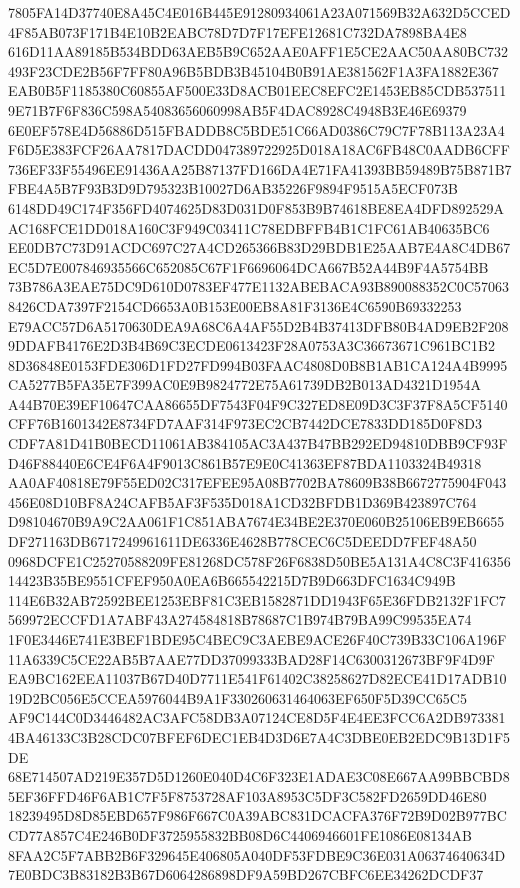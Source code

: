 \documentclass[UTF8,fontset=fandol,zihao=-4,a4paper]{ctexart}
\begin{document}
{{7805FA14D37740E8A45C4E016B445E91280934061A23A071569B32A632D5CCED4F85AB073F171B4E10B2EABC78D7D7F17EFE12681C732DA7898BA4E8
616D11AA89185B534BDD63AEB5B9C652AAE0AFF1E5CE2AAC50AA80BC732493F23CDE2B56F7FF80A96B5BDB3B45104B0B91AE381562F1A3FA1882E367
EAB0B5F1185380C60855AF500E33D8ACB01EEC8EFC2E1453EB85CDB5375119E71B7F6F836C598A54083656060998AB5F4DAC8928C4948B3E46E69379
6E0EF578E4D56886D515FBADDB8C5BDE51C66AD0386C79C7F78B113A23A4F6D5E383FCF26AA7817DACDD047389722925D018A18AC6FB48C0AADB6CFF
736EF33F55496EE91436AA25B87137FD166DA4E71FA41393BB59489B75B871B7FBE4A5B7F93B3D9D795323B10027D6AB35226F9894F9515A5ECF073B
6148DD49C174F356FD4074625D83D031D0F853B9B74618BE8EA4DFD892529AAC168FCE1DD018A160C3F949C03411C78EDBFFB4B1C1FC61AB40635BC6
EE0DB7C73D91ACDC697C27A4CD265366B83D29BDB1E25AAB7E4A8C4DB67EC5D7E007846935566C652085C67F1F6696064DCA667B52A44B9F4A5754BB
73B786A3EAE75DC9D610D0783EF477E1132ABEBACA93B890088352C0C570638426CDA7397F2154CD6653A0B153E00EB8A81F3136E4C6590B69332253
E79ACC57D6A5170630DEA9A68C6A4AF55D2B4B37413DFB80B4AD9EB2F2089DDAFB4176E2D3B4B69C3ECDE0613423F28A0753A3C36673671C961BC1B2
8D36848E0153FDE306D1FD27FD994B03FAAC4808D0B8B1AB1CA124A4B9995CA5277B5FA35E7F399AC0E9B9824772E75A61739DB2B013AD4321D1954A
A44B70E39EF10647CAA86655DF7543F04F9C327ED8E09D3C3F37F8A5CF5140CFF76B1601342E8734FD7AAF314F973EC2CB7442DCE7833DD185D0F8D3
CDF7A81D41B0BECD11061AB384105AC3A437B47BB292ED94810DBB9CF93FD46F88440E6CE4F6A4F9013C861B57E9E0C41363EF87BDA1103324B49318
AA0AF40818E79F55ED02C317EFEE95A08B7702BA78609B38B6672775904F043456E08D10BF8A24CAFB5AF3F535D018A1CD32BFDB1D369B423897C764
D98104670B9A9C2AA061F1C851ABA7674E34BE2E370E060B25106EB9EB6655DF271163DB6717249961611DE6336E4628B778CEC6C5DEEDD7FEF48A50
0968DCFE1C25270588209FE81268DC578F26F6838D50BE5A131A4C8C3F41635614423B35BE9551CFEF950A0EA6B665542215D7B9D663DFC1634C949B
114E6B32AB72592BEE1253EBF81C3EB1582871DD1943F65E36FDB2132F1FC7569972ECCFD1A7ABF43A274584818B78687C1B974B79BA99C99535EA74
1F0E3446E741E3BEF1BDE95C4BEC9C3AEBE9ACE26F40C739B33C106A196F11A6339C5CE22AB5B7AAE77DD37099333BAD28F14C6300312673BF9F4D9F
EA9BC162EEA11037B67D40D7711E541F61402C38258627D82ECE41D17ADB1019D2BC056E5CCEA5976044B9A1F330260631464063EF650F5D39CC65C5
AF9C144C0D3446482AC3AFC58DB3A07124CE8D5F4E4EE3FCC6A2DB9733814BA46133C3B28CDC07BFEF6DEC1EB4D3D6E7A4C3DBE0EB2EDC9B13D1F5DE
68E714507AD219E357D5D1260E040D4C6F323E1ADAE3C08E667AA99BBCBD85EF36FFD46F6AB1C7F5F8753728AF103A8953C5DF3C582FD2659DD46E80
18239495D8D85EBD657F986F667C0A39ABC831DCACFA376F72B9D02B977BCCD77A857C4E246B0DF3725955832BB08D6C4406946601FE1086E08134AB
8FAA2C5F7ABB2B6F329645E406805A040DF53FDBE9C36E031A06374640634D7E0BDC3B83182B3B67D6064286898DF9A59BD267CBFC6EE34262DCDF37
}}
\end{document}
